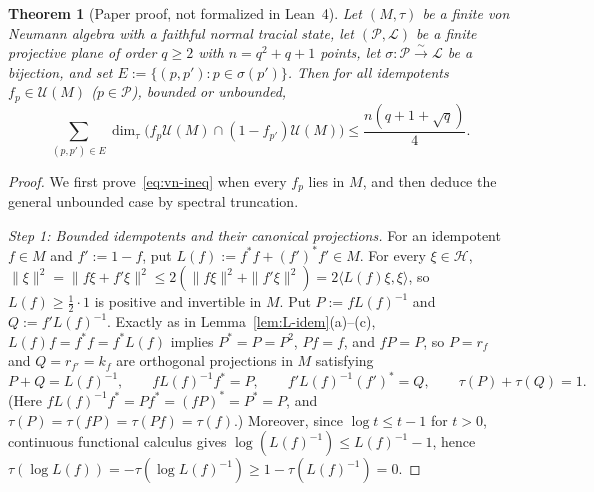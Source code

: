 \documentclass[11pt]{article}
\newtheorem{theorem}{Theorem}[section]
\theoremstyle{definition}
\theoremstyle{remark}
\numberwithin{equation}{section}
\newcommand{\U}{\mathcal{U}}
\newcommand{\HH}{\mathcal{H}}
\newcommand{\PP}{\mathcal{P}}
\newcommand{\LL}{\mathcal{L}}
\newcommand{\1}{\mathbf{1}}
\begin{document}
\begin{theorem}[Paper proof, not formalized in Lean~4]
\label{thm:vn-ineq}
Let $(M, \tau)$ be a finite von Neumann algebra with a faithful normal tracial state, let $(\PP, \LL)$ be a finite projective plane of order $q \ge 2$ with $n = q^2 + q + 1$ points, let $\sigma\colon \PP \xrightarrow{\sim} \LL$ be a bijection, and set $E := \{(p, p') : p \in \sigma(p')\}$. Then for all idempotents $f_p \in \U(M)$ ($p \in \PP$), bounded or unbounded,
\begin{equation}
\label{eq:vn-ineq}
\sum_{(p, p') \in E} \dim_\tau\bigl(f_p \U(M) \cap (1 - f_{p'})\U(M)\bigr) \le \frac{n(q + 1 + \sqrt{q})}{4}.
\end{equation}
\end{theorem}

\begin{proof}
We first prove~\eqref{eq:vn-ineq} when every $f_p$ lies in $M$, and then deduce the general unbounded case by spectral truncation.

\emph{Step 1: Bounded idempotents and their canonical projections.}
For an idempotent $f \in M$ and $f' := 1 - f$, put $L(f) := f^*f + (f')^*f' \in M$. For every $\xi \in \HH$, $\|\xi\|^2 = \|f\xi + f'\xi\|^2 \le 2(\|f\xi\|^2 + \|f'\xi\|^2) = 2\langle L(f)\xi, \xi\rangle$, so $L(f) \ge \frac{1}{2}\cdot 1$ is positive and invertible in $M$. Put $P := f L(f)^{-1}$ and $Q := f' L(f)^{-1}$. Exactly as in Lemma~\ref{lem:L-idem}(a)--(c), $L(f)f = f^*f = f^* L(f)$ implies $P^* = P = P^2$, $Pf = f$, and $fP = P$, so $P = r_f$ and $Q = r_{f'} = k_f$ are orthogonal projections in $M$ satisfying
\begin{equation}
\label{eq:vn-PQ}
P + Q = L(f)^{-1}, \qquad f L(f)^{-1} f^* = P, \qquad f' L(f)^{-1} (f')^* = Q, \qquad \tau(P) + \tau(Q) = 1.
\end{equation}
(Here $f L(f)^{-1} f^* = P f^* = (fP)^* = P^* = P$, and $\tau(P) = \tau(fP) = \tau(Pf) = \tau(f)$.) Moreover, since $\log t \le t - 1$ for $t > 0$, continuous functional calculus gives $\log(L(f)^{-1}) \le L(f)^{-1} - 1$, hence $\tau(\log L(f)) = -\tau(\log L(f)^{-1}) \ge 1 - \tau(L(f)^{-1}) = 0$.


\end{proof}
\end{document}
